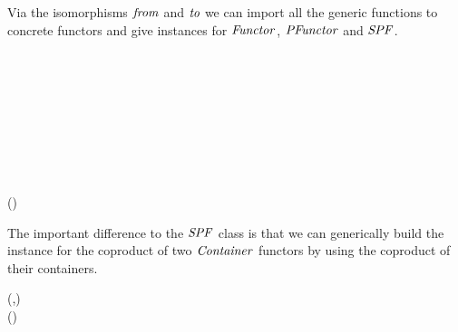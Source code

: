 Via the isomorphisms \ensuremath{\Varid{from}} and \ensuremath{\Varid{to}} we can import all the generic
functions to concrete functors and give instances for \ensuremath{\Conid{Functor}},
\ensuremath{\Conid{PFunctor}} and \ensuremath{\Conid{SPF}}.
\begin{hscode}\SaveRestoreHook
{}%
%
%
%
%
\>[3]{}\;\;\Rightarrow {}\;\;\<[E]%
\\
\>[3]{}\<[5]%
\>[5]{}\;\<[15]%
\>[15]{}\mathrel{=}\;\<[E]%
\\
\>[3]{}\;\;\Rightarrow {}\;\;\<[E]%
\\
\>[3]{}\<[5]%
\>[5]{}\;\<[15]%
\>[15]{}\mathrel{=}\;\<[E]%
\\
\>[3]{}\;\;\Rightarrow {}\;\;\<[E]%
\\
\>[3]{}\<[5]%
\>[5]{}\<[15]%
\>[15]{}\mathrel{=}\;\;\<[E]%
\\
\>[3]{}\<[5]%
\>[5]{}\<[15]%
\>[15]{}\mathrel{=}\<[E]%
\\
\>[3]{}\<[5]%
\>[5]{}\<[15]%
\>[15]{}\mathrel{=}\<[E]%
\\
\>[3]{}\<[5]%
\>[5]{}\;\<[15]%
\>[15]{}\mathrel{=}\;(){}\<[E]%
\\
\>[3]{}\<[5]%
\>[5]{}\<[E]%
\ColumnHook
\end{hscode}\resethooks
The important difference to the \ensuremath{\Conid{SPF}} class is that we can generically
build the instance for the coproduct of two \ensuremath{\Conid{Container}} functors by
using the coproduct of their containers.
\begin{hscode}\SaveRestoreHook
{}%
%
%
%
\>[3]{}\;(\;,\;)\Rightarrow {}\<[E]%
\\
\>[3]{}\<[6]%
\>[6]{}\;(\oplus{}){}\<[E]%
\ColumnHook
\end{hscode}\resethooks

